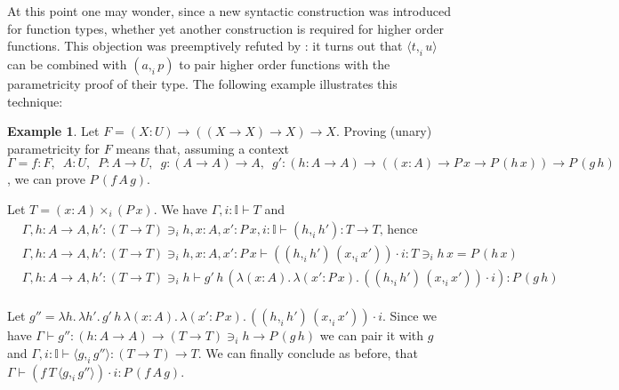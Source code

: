 \documentclass[english]{PaperTools/latex/entcs}
\theoremstyle{plain}
\theoremstyle{definition}
\newtheorem{example}[theorem]{Example}
\theoremstyle{remark}
\newcommand\CP[3]{(#2,_{#1} #3)}
\newcommand\CTimes[2]{(#2) ×_{#1}}
\newcommand\param[1]{\!\cdot\!#1}
\newcommand\op[1]{∋_{#1}}
\newcommand\fp[3]{⟨#2 ,_{#1} #3⟩}
\begin{document}
At this point one may wonder, since a new syntactic construction was
introduced for function types, whether yet another construction is required
for higher order functions.  This objection was preemptively refuted by
: it turns out that $\fp i t u$ can be combined
with $\CP i a p$ to pair higher order functions with the parametricity
proof of their type.  The following example illustrates this technique:

\begin{example}
  Let $F = (X : U) → ((X → X) → X) → X$.
  Proving (unary) parametricity for $F$ means that, assuming a context
    $Γ = f : F,\enspace
    A : U,\enspace
    P : A → U,\enspace
    g : (A → A) → A,\enspace
    g' : (h : A → A) → ((x : A) → P\, x → P\, (h\, x)) → P\, (g\, h)$,
  we can prove $P\, (f\, A\, g)$.

  Let $T = \CTimes i {x:A} {(P\,x)}$.
  We have $Γ, i:𝕀 ⊢ T$ and\\[-1.3\baselineskip]%
  \begin{align*}
    \!\!\!&Γ, h:A → A, h': (T → T) \op i h, x : A, x' : P\, x, i:𝕀 ⊢ \CP i h {h'} : T → T\text{, hence}
    \\
    \!\!\!&Γ, h:A → A, h': (T → T) \op i h, x : A, x' : P\, x ⊢ (\CP i h {h'}\, \CP i x {x'}) \param i : T \op i h\, x = P\, (h\, x)
    \\
    \!\!\!&Γ, h:A → A, h': (T → T) \op i h ⊢ g'\, h\, (λ (x : A).\, λ (x' : P\, x).\, (\CP i h {h'}\, \CP i x {x'}) \param i) : P\, (g\, h)
  \end{align*}\\[-1.3\baselineskip]%
  Let $g'' = λ h.\, λ h'.\, g'\, h\, λ (x : A).\, λ (x' : P\, x).\, (\CP i h {h'}\, \CP i x {x'}) \param i$.
  Since we have $Γ ⊢ g'' : (h:A → A) → (T → T) \op i h → P\, (g\, h)$
  we can pair it with $g$ and
  $Γ, i:𝕀 ⊢ \fp i g {g''} : (T → T) → T$. We can finally conclude as before, that
  $Γ ⊢ (f\, T\, \fp i g {g''}) \param i : P\, (f\, A\, g)$.
\end{example}
\end{document}
